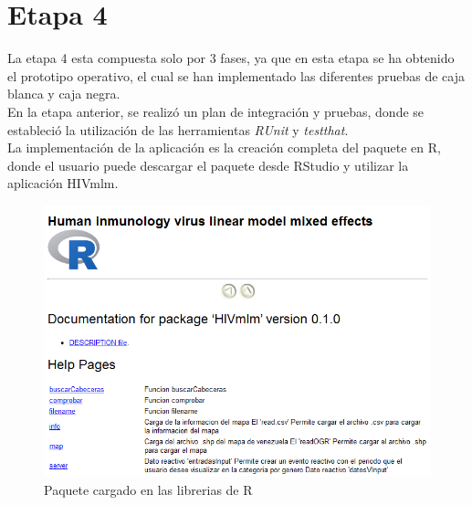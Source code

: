 \section{Etapa 4}
    
La etapa 4 esta compuesta  solo por 3 fases, ya que en esta etapa se ha obtenido el prototipo operativo, el cual se han implementado las diferentes pruebas de caja blanca y caja negra.\\

En la etapa anterior, se realiz\'o un plan de integraci\'on y pruebas, donde se estableci\'o la utilizaci\'on de las herramientas \textit{RUnit} y \textit{testthat}. \\

La implementaci\'on de la aplicaci\'on es la creaci\'on completa del paquete en R, donde el usuario puede descargar el paquete desde RStudio y utilizar la aplicaci\'on HIVmlm.

\begin{figure}[H]
\centering
\includegraphics[scale=0.8]{HIVmlm.PNG}
\caption{Paquete cargado en las librerias de R}
\end{figure}








 
